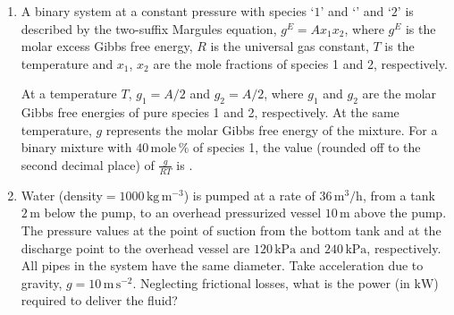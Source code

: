 \documentclass[journal,12pt,onecolumn]{IEEEtran}
\theoremstyle{remark}
\begin{document}
\begin{enumerate}
\item A binary system at a constant pressure with species `$1$' and `' and `$2$' is described by the two-suffix Margules equation, $g^E = A x_1 x_2$, where $g^E$ is the molar excess Gibbs free energy, $R$ is the universal gas constant, $T$ is the temperature and $x_1$, $x_2$ are the mole fractions of species 1 and 2, respectively.

At a temperature $T$, $g_1 = A/2$ and $g_2 = A/2$, where $g_1$ and $g_2$ are the molar Gibbs free energies of pure species 1 and 2, respectively. At the same temperature, $g$ represents the molar Gibbs free energy of the mixture. For a binary mixture with $40 \, \text{mole} \, \%$ of species 1, the value (rounded off to the second decimal place) of $\frac{g}{RT}$ is \underline{\hspace{1cm}}.\hfill{}

\item  Water (density$=1000 \, \text{kg} \, \text{m}^{-3}$) is pumped at a rate of $36 \, \text{m}^3/\text{h}$, from a tank $2 \, \text{m}$ below the pump, to an overhead pressurized vessel $10 \, \text{m}$ above the pump. The pressure values at the point of suction from the bottom tank and at the discharge point to the overhead vessel are $120 \, \text{kPa}$ and $240 \, \text{kPa}$, respectively. All pipes in the system have the same diameter. Take acceleration due to gravity, $g = 10 \, \text{m} \, \text{s}^{-2}$. Neglecting frictional losses, what is the power (in $\text{kW}$) required to deliver the fluid?
\hfill{}
\begin{enumerate}
\end{enumerate}


\end{enumerate}
\end{document}
